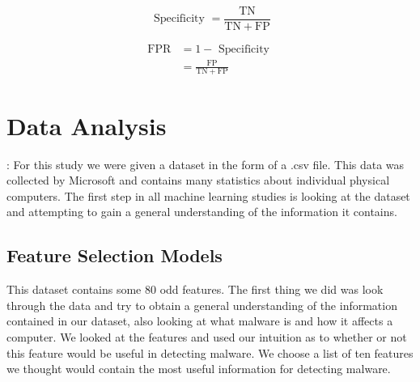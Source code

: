 \documentclass[sigconf]{acmart}
\begin{document}
\begin{equation}
\text { Specificity }=\frac{\text { TN }}{\mathrm{TN}+\mathrm{FP}}
\end{equation}

\begin{equation}
\begin{aligned} \mathrm{FPR} &=1-\text { Specificity } \\ &=\frac{\mathrm{FP}}{\mathrm{TN}+\mathrm{FP}} \end{aligned}
\end{equation}
 
\section{Data Analysis}:
For this study we were given a dataset in the form of a .csv file. This data was collected by Microsoft and contains many statistics about individual physical computers. The first step in all machine learning studies is looking at the dataset and attempting to gain a general understanding of the information it contains. 
\subsection{Feature Selection Models}
This dataset contains some 80 odd features. The first thing we did was look through the data and try to obtain a general understanding of the information contained in our dataset, also looking at what malware is and how it affects a computer. We looked at the features and used our intuition as to whether or not this feature would be useful in detecting malware. We choose a list of ten features we thought would contain the most useful information for detecting malware. 
\end{document}
